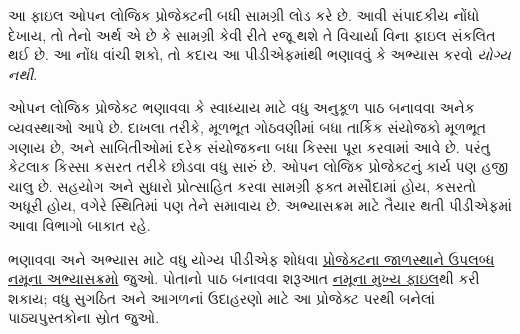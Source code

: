 \documentclass[../include/open-logic-part]{subfiles}
\begin{document}
\clearpage

\begin{editorial}
આ ફાઇલ ઓપન લોજિક પ્રોજેક્ટની બધી સામગ્રી લોડ કરે છે.
આવી સંપાદકીય નોંધો દેખાય, તો તેનો અર્થ એ છે કે સામગ્રી
કેવી રીતે રજૂ થશે તે વિચાર્યા વિના ફાઇલ સંકલિત થઈ છે.
આ નોંધ વાંચી શકો, તો કદાચ આ પીડીએફમાંથી ભણાવવું કે
અભ્યાસ કરવો \emph{યોગ્ય નથી}.

ઓપન લોજિક પ્રોજેક્ટ ભણાવવા કે સ્વાધ્યાય માટે વધુ અનુકૂળ
પાઠ બનાવવા અનેક વ્યવસ્થાઓ આપે છે.
દાખલા તરીકે, મૂળભૂત ગોઠવણીમાં બધા તાર્કિક સંયોજકો મૂળભૂત ગણાય છે,
અને સાબિતીઓમાં દરેક સંયોજકના બધા કિસ્સા પૂરા કરવામાં આવે છે.
પરંતુ કેટલાક કિસ્સા કસરત તરીકે છોડવા વધુ સારું છે.
ઓપન લોજિક પ્રોજેક્ટનું કાર્ય પણ હજી ચાલુ છે.
સહયોગ અને સુધારો પ્રોત્સાહિત કરવા સામગ્રી ફક્ત મસૌદામાં હોય,
કસરતો અધૂરી હોય, વગેરે સ્થિતિમાં પણ તેને સમાવાય છે.
અભ્યાસક્રમ માટે તૈયાર થતી પીડીએફમાં આવા વિભાગો બાકાત રહે.

ભણાવવા અને અભ્યાસ માટે વધુ યોગ્ય પીડીએફ શોધવા
\href{http://builds.openlogicproject.org/}{પ્રોજેક્ટના જાળસ્થાને ઉપલબ્ધ નમૂના અભ્યાસક્રમો} જુઓ.
પોતાનો પાઠ બનાવવા શરૂઆત
\href{https://github.com/OpenLogicProject/OpenLogic/tree/master/courses/sample}{નમૂના મુખ્ય ફાઇલ}થી કરી શકાય;
વધુ સુગઠિત અને આગળનાં ઉદાહરણો માટે આ પ્રોજેક્ટ પરથી
બનેલાં પાઠ્યપુસ્તકોના સ્રોત જુઓ.
\end{editorial}


















\end{document}

